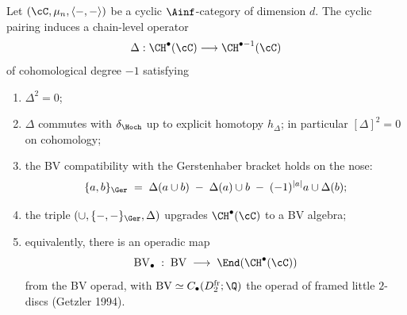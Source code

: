 \begin{proposition}
\label{wave-cfg-prop:tmg-bv}
Let $(\cC,\mu_n,\langle-,-\rangle)$ be a cyclic $\Ainf$-category of
dimension $d$. The cyclic pairing induces a chain-level operator
\[
\Delta:\CH^\bullet(\cC)\longrightarrow\CH^{\bullet-1}(\cC)
\]
of cohomological degree $-1$ satisfying
\begin{enumerate}
\item $\Delta^2=0$;
\item $\Delta$ commutes with $\delta_\Hoch$ up to explicit homotopy
$h_\Delta$; in particular $[\Delta]^2=0$ on cohomology;
\item the BV compatibility with the Gerstenhaber bracket holds on the
nose:
\[
\{a,b\}_\Ger\;=\;\Delta(a\cup b)\;-\;\Delta(a)\cup b\;-\;(-1)^{|a|}a\cup\Delta(b);
\]
\item the triple $(\cup,\{-,-\}_\Ger,\Delta)$ upgrades
$\CH^\bullet(\cC)$ to a BV algebra;
\item equivalently, there is an operadic map
\[
\mathrm{BV}_\bullet\;:\;\mathrm{BV}\;\longrightarrow\;\End(\CH^\bullet(\cC))
\]
from the BV operad, with $\mathrm{BV}\simeq C_\bullet(D^{\mathrm{fr}}_2;\Q)$
the operad of framed little $2$-discs (Getzler 1994).
\end{enumerate}
\end{proposition}


